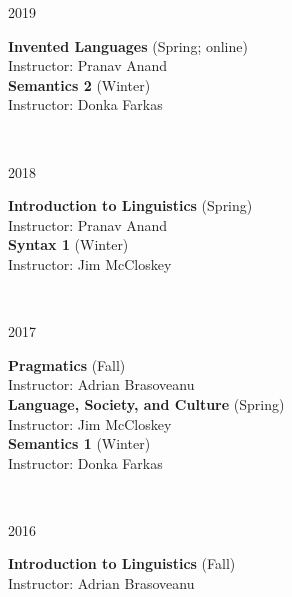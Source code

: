 \documentclass[12pt]{article} %
\begin{document}
\vspace{0.08cm}

\begin{minipage}[t]{3cm}
2019
\end{minipage}
\begin{minipage}[t]{\smallertextwidth} \textbf{Invented Languages} (Spring; online)\\ Instructor: Pranav Anand\\\textbf{Semantics 2} (Winter)\\Instructor: Donka Farkas\end{minipage}\\

\vspace{0.08cm}

\begin{minipage}[t]{3cm}
2018
\end{minipage}
\begin{minipage}[t]{\smallertextwidth} \textbf{Introduction to Linguistics} (Spring)\\ Instructor: Pranav Anand\\\textbf{Syntax 1} (Winter)\\Instructor: Jim McCloskey\end{minipage}\\

\vspace{0.08cm}


\begin{minipage}[t]{3cm}
2017
\end{minipage}
\begin{minipage}[t]{\smallertextwidth}\textbf{Pragmatics} (Fall)\\Instructor: Adrian Brasoveanu\\\textbf{Language, Society, and Culture} (Spring)\\Instructor: Jim McCloskey\\\textbf{Semantics 1} (Winter)\\ Instructor: Donka Farkas\end{minipage}\\

\vspace{0.08cm}

\begin{minipage}[t]{3cm}
2016
\end{minipage}
\begin{minipage}[t]{\smallertextwidth}\textbf{Introduction to Linguistics} (Fall)\\Instructor: Adrian Brasoveanu\end{minipage}\\
\end{document}
